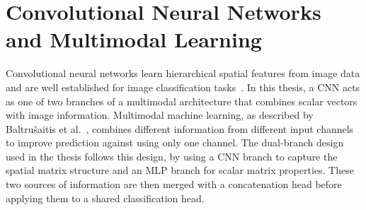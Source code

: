 \section{Convolutional Neural Networks and Multimodal Learning}\label{sec:cnn-background}

Convolutional neural networks learn hierarchical spatial features from image data and are
well established for image classification tasks~\cite{krizhevsky2012imagenet}.
In this thesis, a CNN acts as one of two branches of a multimodal architecture that combines scalar vectors
with image information.
Multimodal machine learning, as described by Baltru\v{s}aitis et al.~\cite{baltruvsaitis2018multimodal}, combines
different information from different input channels to improve prediction against using only one channel.
The dual-branch design used in the thesis follows this design, by using a CNN branch to capture
the spatial matrix structure and an MLP branch for scalar matrix properties.
These two sources of information are then merged with a concatenation head before applying them to a shared classification head.


